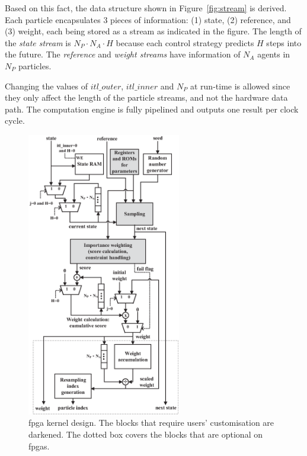 Based on this fact, the data structure shown in Figure~\ref{fig:stream} is derived.
Each particle encapsulates 3 pieces of information: (1) state, (2) reference, and (3) weight, each being stored as a stream as indicated in the figure.
The length of the \textit{state stream} is $N_P \cdot N_A \cdot H$ because each control strategy predicts $H$ steps into the future.
The \textit{reference} and \textit{weight streams} have information of $N_A$ agents in $N_P$ particles.

Changing the values of $itl\_outer$, $itl\_inner$ and $N_P$ at run-time is allowed since they only affect the length of the particle streams, and not the hardware data path.
The computation engine is fully pipelined and outputs one result per clock cycle.

\begin{figure}[t!]
\begin{center}
\includegraphics[width=0.6\textwidth]{design_flow/figures/kernel}
\end{center}
\caption{\gls{fpga} kernel design. The blocks that require users' customisation are darkened. The dotted box covers the blocks that are optional on \gls{fpga}s.}
\label{fig:kernel}
\end{figure}

